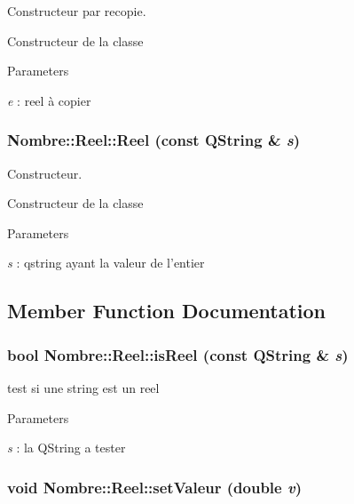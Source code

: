 Constructeur par recopie. 

Constructeur de la classe


\begin{DoxyParams}{Parameters}
\item[{\em e}]: reel à copier \end{DoxyParams}
\hypertarget{classNombre_1_1Reel_a810be76247a67b0bcea16e94bc734fc2}{
\subsubsection[{Reel}]{\setlength{\rightskip}{0pt plus 5cm}Nombre::Reel::Reel (const QString \& {\em s})}}
\label{classNombre_1_1Reel_a810be76247a67b0bcea16e94bc734fc2}


Constructeur. 

Constructeur de la classe


\begin{DoxyParams}{Parameters}
\item[{\em s}]: qstring ayant la valeur de l'entier \end{DoxyParams}


\subsection{Member Function Documentation}
\hypertarget{classNombre_1_1Reel_ae6dec0b4607388e95e1247c215fa165d}{
\subsubsection[{isReel}]{\setlength{\rightskip}{0pt plus 5cm}bool Nombre::Reel::isReel (const QString \& {\em s})}}
\label{classNombre_1_1Reel_ae6dec0b4607388e95e1247c215fa165d}


test si une string est un reel 


\begin{DoxyParams}{Parameters}
\item[{\em s}]: la QString a tester \end{DoxyParams}
\hypertarget{classNombre_1_1Reel_a7c8c6736be61f1bb9583bb2f67310d24}{
\subsubsection[{setValeur}]{\setlength{\rightskip}{0pt plus 5cm}void Nombre::Reel::setValeur (double {\em v})}}
\label{classNombre_1_1Reel_a7c8c6736be61f1bb9583bb2f67310d24}


